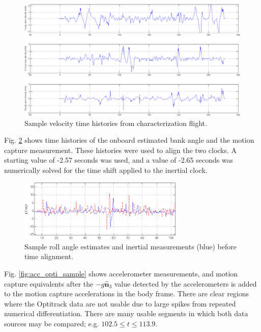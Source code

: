 \documentclass{article}
\newcommand{\U}[1]{\hat{\textbf{#1}}} %
\begin{document}
\begin{figure}[tb!]
\centering
\includegraphics[width=\textwidth]{vel_sample.png}
\caption{Sample velocity time histories from characterization flight.}
\label{fig:vel_sample}
\end{figure}

Fig. \ref{fig:phi_align} shows time histories of the onboard estimated bank angle and the motion capture measurement. These histories were used to align the two clocks. A starting value of -2.57 seconds was used, and a value of -2.65 seconds was numerically solved for the time shift applied to the inertial clock.

\begin{figure}[tb!]
\centering
\includegraphics[width=0.7\textwidth]{phi_alignment.png}
\caption{Sample roll angle estimates and inertial measurements (blue) before time alignment.}
\label{fig:phi_align}
\end{figure}

Fig. \ref{fig:acc_opti_sample} shows accelerometer measurements, and motion capture equivalents after the $-g\U{n}_3$ value detected by the accelerometers is added to the motion capture accelerations in the body frame. There are clear regions where the Optitrack data are not usable due to large spikes from repeated numerical differentiation. There are many usable segments in which both data sources may be compared; e.g. $102.5 \leq t \leq 113.9$.
\end{document}
